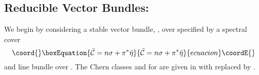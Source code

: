 \documentclass[a4paper,12pt]{article}
\numberwithin{equation}{section}
\def\cN{{\mathcal N}}
\theoremstyle{plain}
\begin{document}
\subsection*{Reducible Vector Bundles:}

We begin by considering a stable \coordHE{} vector bundle,
\coordHE{}, over 
\coordHE{} specified by a spectral cover 
\begin{equation}\coord{}\boxEquation{
\bar{\cal{C}}=n\sigma+\pi^{*}\bar{\eta}
\label{eq:127}
}{
\bar{\cal{C}}=n\sigma+\pi^{*}\bar{\eta}
}{ecuacion}\coordE{}\end{equation}
and line bundle \myHighlight{$\overline{\cN}$}\coordHE{} over \coordHE{}. The Chern classes
\myHighlight{$c_{1}(\overline{\cN})$}\coordHE{} and \coordHE{} for \coordHE{} are given in
with \myHighlight{$\eta$}\coordHE{} replaced by \myHighlight{$\bar{\eta}$}\coordHE{}.
\end{document}
